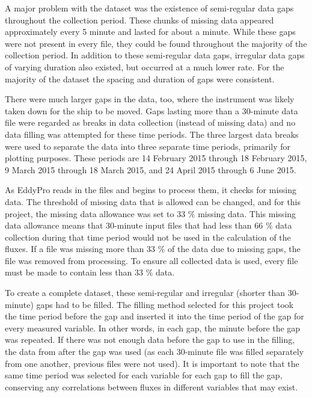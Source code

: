 A major problem with the dataset was the existence of semi-regular data gaps throughout the collection period. These chunks of missing data appeared approximately every 5 minute and lasted for about a minute. While these gaps were not present in every file, they could be found throughout the majority of the collection period. In addition to these semi-regular data gaps, irregular data gaps of varying duration also existed, but occurred at a much lower rate. For the majority of the dataset the spacing and duration of gaps were consistent.

There were much larger gaps in the data, too, where the instrument was likely taken down for the ship to be moved. Gaps lasting more than a 30-minute data file were regarded as breaks in data collection (instead of missing data) and no data filling was attempted for these time periods. The three largest data breaks were used to separate the data into three separate time periods, primarily for plotting purposes. These periods are 14 February 2015 through 18 February 2015, 9 March 2015 through 18 March 2015, and 24 April 2015 through 6 June 2015.  

As EddyPro reads in the files and begins to process them, it checks for missing data. The threshold of missing data that is allowed can be changed, and for this project, the missing data allowance was set to 33 $\%$ missing data. This missing data allowance means that 30-minute input files that had less than 66 $\%$ data collection during that time period would not be used in the calculation of the fluxes. If a file was missing more than 33 $\%$ of the data due to missing gaps, the file was removed from processing. To ensure all collected data is used, every file must be made to contain less than 33 $\%$ data. 
 
 To create a complete dataset, these semi-regular and irregular (shorter than 30-minute) gaps had to be filled. The filling method selected for this project took the time period before the gap and inserted it into the time period of the gap for every measured variable. In other words, in each gap, the minute before the gap was repeated. If there was not enough data before the gap to use in the filling, the data from after the gap was used (as each 30-minute file was filled separately from one another, previous files were not used). It is important to note that the same time period was selected for each variable for each gap to fill the gap, conserving any correlations between fluxes in different variables that may exist.  

